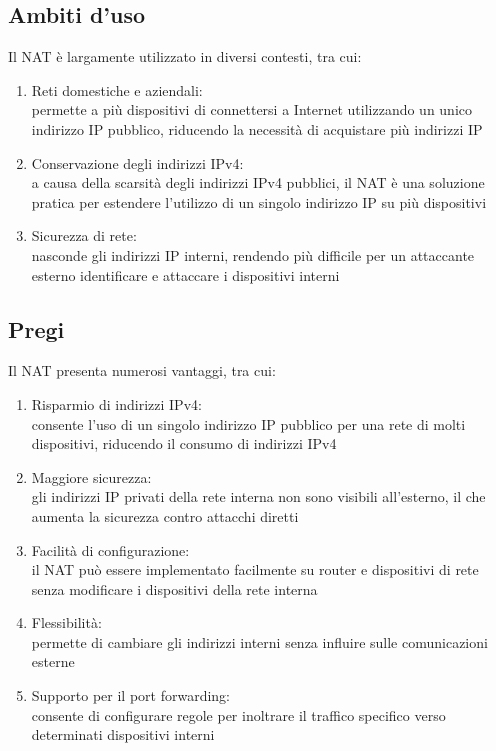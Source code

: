 \documentclass[10pt,oneside,a4paper]{article}
\begin{document}
\subsection{Ambiti d'uso}
Il NAT è largamente utilizzato in diversi contesti, tra cui:
\begin{enumerate}
\item Reti domestiche e aziendali:\\
permette a più dispositivi di connettersi a Internet utilizzando un unico indirizzo IP pubblico, riducendo la necessità di acquistare più indirizzi IP
\item Conservazione degli indirizzi IPv4:\\
a causa della scarsità degli indirizzi IPv4 pubblici, il NAT è una soluzione pratica per estendere l'utilizzo di un singolo indirizzo IP su più dispositivi
\item Sicurezza di rete:\\
nasconde gli indirizzi IP interni, rendendo più difficile per un attaccante esterno identificare e attaccare i dispositivi interni
\end{enumerate}
\subsection{Pregi}
Il NAT presenta numerosi vantaggi, tra cui:
\begin{enumerate}
\item Risparmio di indirizzi IPv4:\\
consente l'uso di un singolo indirizzo IP pubblico per una rete di molti dispositivi, riducendo il consumo di indirizzi IPv4
\item Maggiore sicurezza:\\
gli indirizzi IP privati della rete interna non sono visibili all'esterno, il che aumenta la sicurezza contro attacchi diretti
\item Facilità di configurazione:\\
il NAT può essere implementato facilmente su router e dispositivi di rete senza modificare i dispositivi della rete interna
\item Flessibilità:\\
permette di cambiare gli indirizzi interni senza influire sulle comunicazioni esterne
\item Supporto per il port forwarding:\\
consente di configurare regole per inoltrare il traffico specifico verso determinati dispositivi interni
\end{enumerate}
\end{document}

